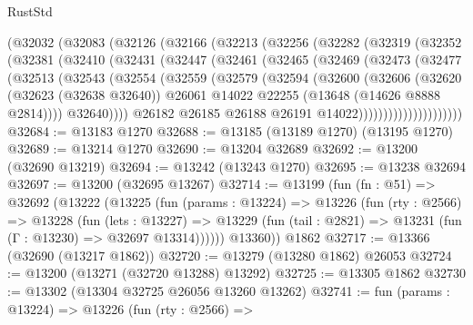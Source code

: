 \begin{lexlean}{RustStd}
\begin{coremodule}
    (@32032
      (@32083
        (@32126
          (@32166
            (@32213
              (@32256
                (@32282
                  (@32319
                    (@32352
                      (@32381
                        (@32410
                          (@32431
                            (@32447
                              (@32461
                                (@32465
                                  (@32469
                                    (@32473
                                      (@32477
                                        (@32513
                                          (@32543
                                            (@32554
                                              (@32559
                                                (@32579
                                                  (@32594
                                                    (@32600
                                                      (@32606
                                                        (@32620
                                                          (@32623 (@32638 @32640))
                                                          @26061
                                                          @14022
                                                          @22255
                                                          (@13648 (@14626 @8888 @2814))))
                                                      @32640))))
                                              @26182
                                              @26185
                                              @26188
                                              @26191
                                              @14022)))))))))))))))))))))
@32684 := @13183 @1270
@32688 := @13185 (@13189 @1270) (@13195 @1270)
@32689 := @13214 @1270
@32690 := @13204 @32689
@32692 := @13200 (@32690 @13219)
@32694 := @13242 (@13243 @1270)
@32695 := @13238 @32694
@32697 := @13200 (@32695 @13267)
@32714 := @13199
    (fun (fn : @51) =>
    @32692
      (@13222
        (@13225
          (fun (params : @13224) =>
          @13226
            (fun (rty : @2566) =>
            @13228
              (fun (lets : @13227) =>
              @13229 (fun (tail : @2821) => @13231 (fun (Γ : @13230) => @32697 @13314))))))
        @13360))
    @1862
@32717 := @13366 (@32690 (@13217 @1862))
@32720 := @13279 (@13280 @1862) @26053
@32724 := @13200 (@13271 (@32720 @13288) @13292)
@32725 := @13305 @1862
@32730 := @13302 (@13304 @32725 @26056 @13260 @13262)
@32741 := fun (params : @13224) =>
  @13226
    (fun (rty : @2566) =>

\end{coremodule}
\end{lexlean}

